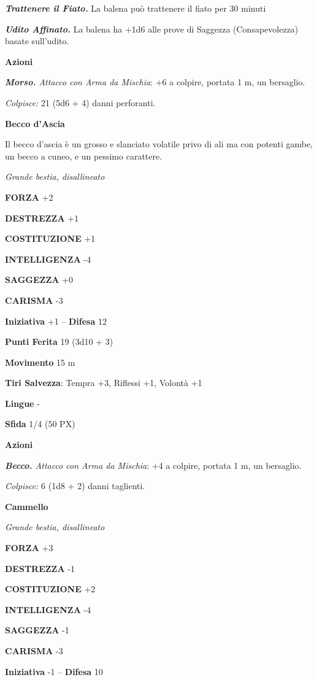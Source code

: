 \begin{multicols}{2}
\textit{\textbf{Trattenere il Fiato.}} La balena può trattenere il fiato per 30 minuti

\textit{\textbf{Udito Affinato.}} La balena ha +1d6 alle prove di Saggezza (Consapevolezza) basate sull'udito.

\textbf{Azioni}

\textit{\textbf{Morso.} Attacco con Arma da Mischia}: +6 a colpire, portata 1 m, un bersaglio.

\textit{Colpisce:} 21 (5d6 + 4) danni perforanti.

\medskip\textbf{Becco d'Ascia}

Il becco d'ascia è un grosso e slanciato volatile privo di ali ma con potenti gambe, un becco a cuneo, e un pessimo carattere.

\textit{Grande bestia, disallineato}

\textbf{FORZA} +2

\textbf{DESTREZZA} +1

\textbf{COSTITUZIONE} +1

\textbf{INTELLIGENZA} -4

\textbf{SAGGEZZA} +0

\textbf{CARISMA} -3

\textbf{Iniziativa} +1 -- \textbf{Difesa} 12

\textbf{Punti Ferita} 19 (3d10 + 3)

\textbf{Movimento} 15 m

\textbf{Tiri Salvezza}: Tempra +3, Riflessi +1, Volontà +1

\textbf{Lingue} -

\textbf{Sfida} 1/4 (50 PX)

\textbf{Azioni}

\textit{\textbf{Becco.} Attacco con Arma da Mischia}: +4 a colpire, portata 1 m, un bersaglio.

\textit{Colpisce:} 6 (1d8 + 2) danni taglienti.

\medskip\textbf{Cammello}

\textit{Grande bestia, disallineato}

\textbf{FORZA} +3

\textbf{DESTREZZA} -1

\textbf{COSTITUZIONE} +2

\textbf{INTELLIGENZA} -4

\textbf{SAGGEZZA} -1

\textbf{CARISMA} -3

\textbf{Iniziativa} -1 -- \textbf{Difesa} 10


\end{multicols}
